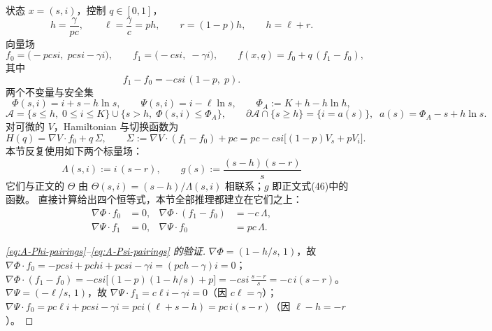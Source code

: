 状态 $x=(s,i)$，控制 $q\in[0,1]$，
\begin{equation}
  h=\frac{\gamma}{pc},\qquad
  \ell=\frac{\gamma}{c}=ph,\qquad
  r=(1-p)h,\qquad
  h=\ell+r .
  \label{eq:A-constants}
\end{equation}
向量场
\begin{equation}
  f_0=\bigl(-pcsi,\;pcsi-\gamma i\bigr),\qquad
  f_1=\bigl(-csi,\;-\gamma i\bigr),\qquad
  f(x,q)=f_0+q\,(f_1-f_0),
  \label{eq:A-fields}
\end{equation}
其中
\begin{equation}
  f_1-f_0=-csi\,(1-p,\;p).
  \label{eq:A-fdiff}
\end{equation}
两个不变量与安全集
\begin{equation}
  \Phi(s,i)=i+s-h\ln s,\qquad
  \Psi(s,i)=i-\ell\ln s,\qquad
  \Phi_A:=K+h-h\ln h,
  \label{eq:A-invariants}
\end{equation}
\begin{equation}
  \mathcal{A}=\{s\le h,\;0\le i\le K\}\cup\{s>h,\;\Phi(s,i)\le \Phi_A\},
  \qquad
  \partial\mathcal{A}\cap\{s\ge h\}=\{i=a(s)\},\;\;a(s)=\Phi_A-s+h\ln s .
  \label{eq:A-safeset}
\end{equation}
对可微的 $V$，Hamiltonian 与切换函数为
\begin{equation}
  H(q)=\nabla V\cdot f_0+q\,\Sigma,
  \qquad
  \Sigma:=\nabla V\cdot(f_1-f_0)+pc
        =pc-csi\bigl[(1-p)V_s+pV_i\bigr].
  \label{eq:A-Sigma}
\end{equation}
本节反复使用如下两个标量场：
\begin{equation}
  \boxed{\;\Lambda(s,i):=i\,(s-r),\qquad
  g(s):=\frac{(s-h)(s-r)}{s}\;}
  \label{eq:A-Lambda-g}
\end{equation}
它们与正文的 $\Theta$ 由 $\Theta(s,i)=(s-h)/\Lambda(s,i)$ 相联系；$g$ 即正文式(46)中的函数。
直接计算给出四个恒等式，本节全部推理都建立在它们之上：
\begin{align}
  \nabla\Phi\cdot f_0&=0, &
  \nabla\Phi\cdot(f_1-f_0)&=-c\,\Lambda,
  \label{eq:A-Phi-pairings}\\
  \nabla\Psi\cdot f_1&=0, &
  \nabla\Psi\cdot f_0&=pc\,\Lambda .
  \label{eq:A-Psi-pairings}
\end{align}

\begin{proof}[\eqref{eq:A-Phi-pairings}--\eqref{eq:A-Psi-pairings} 的验证]
$\nabla\Phi=(1-h/s,\,1)$，故
$\nabla\Phi\cdot f_0=-pcsi+pchi+pcsi-\gamma i=(pch-\gamma)i=0$；
$\nabla\Phi\cdot(f_1-f_0)=-csi\bigl[(1-p)(1-h/s)+p\bigr]=-csi\,\frac{s-r}{s}=-c\,i(s-r)$。
$\nabla\Psi=(-\ell/s,\,1)$，故
$\nabla\Psi\cdot f_1=c\ell i-\gamma i=0$（因 $c\ell=\gamma$）；
$\nabla\Psi\cdot f_0=pc\ell i+pcsi-\gamma i=pci(\ell+s-h)=pc\,i(s-r)$（因 $\ell-h=-r$）。
\end{proof}

